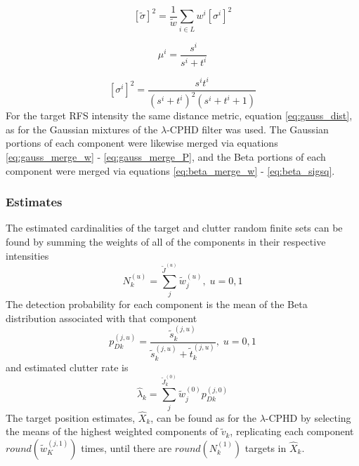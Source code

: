 \documentclass{article}
\newcommand{\clut}{{(0)}}
\newcommand{\tgt}{{(1)}}
\newcommand{\clutj}{{(j,0)}}
\newcommand{\tgtj}{{(j,1)}}
\begin{document}
\begin{equation}
  \label{eq:beta_sigsq_merge}
  \left[ \tilde{\sigma} \right]^2 = \frac{ 1 }{\tilde{w}}\sum_{i \in L}w^i\left[ \sigma^i \right]^2
\end{equation}

\begin{equation}
  \label{eq:beta_mu}
  \mu^i = \frac{s^i}{s^i + t^i}
\end{equation}

\begin{equation}
  \label{eq:beta_sigsq}
  \left[ \sigma^i \right]^2 =
  \frac{ s^i t^i }{ \left( s^i + t^i\right) ^2 \left( s^i + t^i + 1 \right) }
\end{equation}
For the target RFS intensity the same distance metric, equation \eqref{eq:gauss_dist}, as for the Gaussian mixtures of the $\lambda$-CPHD filter was used. The Gaussian portions of each component were likewise merged via equations \eqref{eq:gauss_merge_w} - \eqref{eq:gauss_merge_P}, and the Beta portions of each component were merged via equations \eqref{eq:beta_merge_w} - \eqref{eq:beta_sigsq}.

\subsubsection{Estimates}
The estimated cardinalities of the target and clutter random finite sets can be found by summing the weights of all of the components in their respective intensities
\begin{equation}
  \label{eq:lpd_N}
  N_k^{(u)} = \sum_j^{\tilde{J}^{(u)}}\tilde{w}^{(u)}_j,\;u=0,1
\end{equation}
The detection probability for each component is the mean of the Beta distribution associated with that component
\begin{equation}
  \label{eq:pdk}
  p_{Dk}^{(j,u)} = \frac{ \tilde{s}_{k}^{(j, u)}}{\tilde{s}_{k}^{(j, u)} + \tilde{t}_{k}^{(j, u)}},\;u=0,1
\end{equation}
and estimated clutter rate is
\begin{equation}
  \label{eq:lpd_lambda_hat}
  \hat{\lambda}_k = \sum_j^{\tilde{J}_k^\clut}\tilde{w}^\clut_jp_{Dk}^\clutj 
\end{equation}
The target position estimates, $\hat{X}_k$, can be found as for the $\lambda$-CPHD by selecting the means of the highest weighted components of $\tilde{v}_k$, replicating each component $round(\tilde{w}_K^\tgtj)$ times, until there are $round(N_k^\tgt)$ targets in $\hat{X}_k$.
\end{document}
